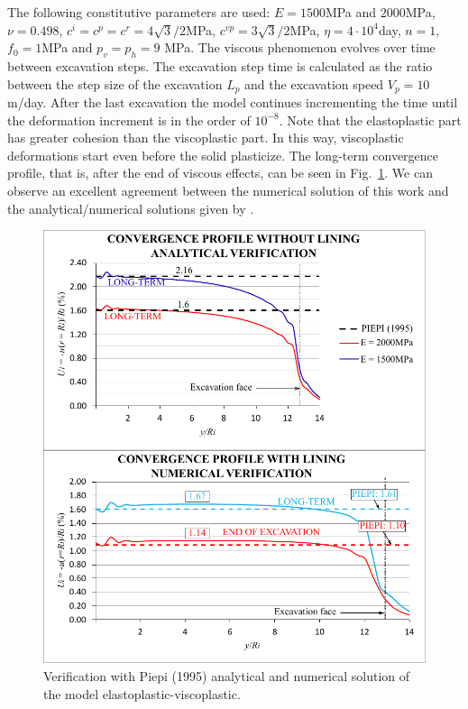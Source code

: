 \documentclass[Journal,letterpaper]{ascelike-new}
\begin{document}
The following constitutive parameters are used: $E=1500$MPa and $2000$MPa, $\nu=0.498$, $c^i=c^p=c^r =4\sqrt{3}/2$MPa, $ c^{vp}=3\sqrt{3}/2$MPa, $\eta = 4 \cdot 10^4$day, $n=1$, $f_0=1$MPa and $p_v=p_h=9$ MPa. The viscous phenomenon evolves over time between excavation steps. The excavation step time is calculated as the ratio between the step size of the excavation $L_p$ and the excavation speed $V_p = 10$m/day. After the last excavation the model continues incrementing the time until the deformation increment is in the order of $10^{-8}$. Note that the elastoplastic part has greater cohesion than the viscoplastic part. In this way, viscoplastic deformations start even before the solid plasticize. The long-term convergence profile, that is, after the end of viscous effects, can be seen in Fig.~\ref{convergence_profile_piepi}. We can observe an excellent agreement between the numerical solution of this work and the analytical/numerical solutions given by .

\begin{figure}
	\centering
	\includegraphics[scale = 1.0]{FIG6.pdf}
	\caption{\label{convergence_profile_piepi}Verification with Piepi (1995) analytical and numerical solution of the model elastoplastic-viscoplastic.}
\end{figure}
\end{document}
